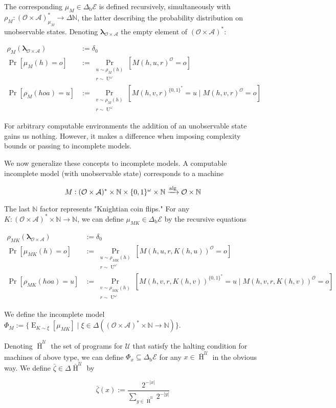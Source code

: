 \documentclass[a4paper]{article}
\newcommand{\Bool}{\{0,1\}}
\newcommand{\Words}{{\Bool^*}}
\newcommand{\Sagas}{{\Bool^\omega}}
\newcommand{\Estr}{{\bm{\lambda}}}
\DeclareMathOperator{\Prb}{Pr}
\newcommand{\PP}[2]{\operatorname{Pr}_{\substack{#1 \\ #2}}}
\DeclareMathOperator{\E}{E}
\DeclareMathOperator{\Un}{U}
\newcommand{\Nats}{\mathbb{N}}
\newcommand{\Abs}[1]{\lvert #1 \rvert}
\newcommand{\Alg}{\xrightarrow{\textnormal{alg}}}
\newcommand{\UTM}{\mathcal{U}}
\newcommand{\SP}[1]{\Delta #1}
\newcommand{\Act}{\mathcal{A}}
\newcommand{\Per}{\mathcal{O}}
\newcommand{\His}{(\Per \times \Act)^*}
\newcommand{\Env}{\mathcal{E}}
\newcommand{\Beh}{\Delta_{\operatorname{b}}}
\newcommand{\EnvB}{\Beh\Env}
\newcommand{\ProgS}{\bar{\operatorname{H}}^\UTM}
\begin{document}
The corresponding ${\mu_M \in \EnvB}$ is defined recursively, simultaneously with ${\rho_M: \His_{\mu_M} \rightarrow \SP{\Nats}}$, the latter describing the probability distribution on unobservable states. Denoting ${\Estr_{\Per \times \Act}}$ the empty element of ${\His}$:

\begin{align*}
\rho_{M}(\Estr_{\Per \times \Act}) &:= \delta_0 \\
\Prb[\mu_M(h)=o] &:= \PP{u \sim \rho_{M}(h)}{r \sim \Un^\omega}[M(h,u,r)^\Per=o] \\
\Prb[\rho_{M}(hoa)=u] &:= \PP{v \sim \rho_{M}(h)}{r \sim \Un^\omega}[M(h,v,r)^\Words=u \mid M(h,v,r)^\Per=o]
\end{align*}

For arbitrary computable environments the addition of an unobservable state gains us nothing. However, it makes a difference when imposing complexity bounds or passing to incomplete models.

We now generalize these concepts to incomplete models. A computable incomplete model (with unobservable state) corresponds to a machine 

$${M: \His \times \Nats \times \Sagas \times \Nats \Alg \Per \times \Nats}$$

The last ${\Nats}$ factor represents "Knightian coin flips." For any ${K: \His \times \Nats \rightarrow \Nats}$, we can define ${\mu_{MK} \in \EnvB}$ by the recursive equations

\begin{align*}
\rho_{MK}(\Estr_{\Per \times \Act}) &:= \delta_0 \\
\Prb[\mu_{MK}(h)=o] &:= \PP{u \sim \rho_{MK}(h)}{r \sim \Un^\omega}[M(h,u,r,K(h,u))^\Per=o] \\
\Prb[\rho_{MK}(hoa)=u] &:= \PP{v \sim \rho_{MK}(h)}{r \sim \Un^\omega}[M(h,v,r,K(h,v))^\Words=u \mid M(h,v,r,K(h,v))^\Per=o]
\end{align*}

We define the incomplete model ${\Phi_M :=\{\E_{K \sim \xi}[\mu_{MK}] \mid \xi \in \SP{(\His \times \Nats \rightarrow \Nats)}\}}$.

Denoting ${\ProgS}$ the set of programs for ${\UTM}$ that satisfy the halting condition for machines of above type, we can define ${\Phi_x \subseteq \EnvB}$ for any ${x \in \ProgS}$ in the obvious way. We define ${\bar{\zeta} \in \Delta \ProgS}$ by

$${\bar{\zeta}(x):=\frac{2^{-\Abs{x}}}{\sum_{y \in \ProgS} 2^{-\Abs{y}}}}$$
\end{document}
